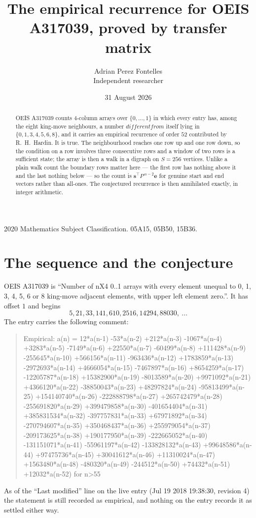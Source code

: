 \documentclass[11pt,a4paper]{article}
\title{The empirical recurrence for OEIS A317039, proved by transfer matrix}
\author{Adrian Perez Fontelles\\ \small Independent researcher}
\date{31 August 2026}
\theoremstyle{plain}
\theoremstyle{definition}
\begin{document}
\maketitle

\begin{abstract}
OEIS A317039 counts $4$-column arrays over $\{0,\dots,1\}$ in which every entry has,
among the eight king-move neighbours, a number $different from$ itself lying in $\{0,1,3,4,5,6,8\}$, and it carries an empirical
recurrence of order $52$ contributed by R.~H.~Hardin. It is true. The neighbourhood
reaches one row up and one row down, so the condition on a row involves three consecutive
rows and a window of two rows is a sufficient state; the array is then a walk in a digraph
on $S=256$ vertices. Unlike a plain walk count the boundary rows matter here --- the first
row has nothing above it and the last nothing below --- so the count is
$\mathbf{s}^{\!\top}P^{\,n-2}\mathbf{e}$ for genuine start and end vectors rather than
all-ones. The conjectured recurrence is then annihilated exactly, in integer arithmetic.
\end{abstract}

\noindent\small 2020 Mathematics Subject Classification. 05A15, 05B50, 15B36.\normalsize

\section{The sequence and the conjecture}

OEIS A317039 is ``Number of nX4 0..1 arrays with every element unequal to 0, 1, 3, 4, 5, 6 or 8 king-move adjacent elements, with upper left element zero.''. It has offset
$1$ and begins
\[
5, 21, 33, 141, 610, 2516, 14294, 88030,\ \dots
\]
The entry carries the following comment:
\begin{quote}\small
Empirical: a(n) = 12*a(n-1) -53*a(n-2) +212*a(n-3) -1067*a(n-4) +3283*a(n-5) -7149*a(n-6) +22550*a(n-7) -60499*a(n-8) +111428*a(n-9) -255645*a(n-10) +566156*a(n-11) -963436*a(n-12) +1783859*a(n-13) -2972693*a(n-14) +4666054*a(n-15) -7467897*a(n-16) +8654259*a(n-17) -12205787*a(n-18) +15382900*a(n-19) -8013589*a(n-20) +9971092*a(n-21) +4366120*a(n-22) -38850043*a(n-23) +48297824*a(n-24) -95813499*a(n-25) +154140740*a(n-26) -222888798*a(n-27) +265742479*a(n-28) -255691820*a(n-29) +399479858*a(n-30) -401654404*a(n-31) +385831534*a(n-32) -397757831*a(n-33) +67971892*a(n-34) -270794607*a(n-35) +350468437*a(n-36) +255979054*a(n-37) -209173625*a(n-38) +190177950*a(n-39) -222665052*a(n-40) -131151071*a(n-41) -55961197*a(n-42) -133828132*a(n-43) +99648586*a(n-44) +97475736*a(n-45) +30041612*a(n-46) +11310024*a(n-47) +1563480*a(n-48) -480320*a(n-49) -244512*a(n-50) +74432*a(n-51) +12032*a(n-52) for n>55
\end{quote}
As of the ``Last modified'' line on the live entry (Jul 19 2018 19:38:30, revision
4) the statement is still recorded as empirical, and nothing on the entry
records it as settled either way.
\end{document}
